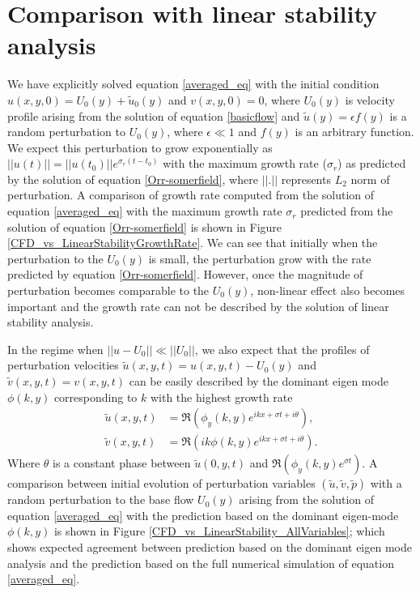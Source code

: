 \documentclass[12pt]{report}   %
\begin{document}
\section{Comparison with linear stability analysis}
We have explicitly solved equation \eqref{averaged_eq} with the initial condition $u(x,y,0) = U_{0}(y)+\tilde{u}_0(y)$ and $v(x,y,0)=0$, where $U_{0}(y)$ is velocity profile arising from the solution of equation \eqref{basicflow} and $\tilde{u}(y) = \epsilon f(y)$ is a random perturbation to $U_0(y)$, where $\epsilon \ll 1$ and $f(y)$ is an arbitrary function. We expect this perturbation to grow exponentially as $||u(t)|| = ||u(t_0)|| e^{\sigma_r (t-t_0)}$ with the maximum growth rate ($\sigma_r$) as predicted by the solution of equation \eqref{Orr-somerfield}, where $||.||$ represents $L_2$ norm of perturbation. A comparison of growth rate computed from the solution of equation \eqref{averaged_eq} with the
maximum growth rate $\sigma_r$ predicted from the solution of equation \eqref{Orr-somerfield} is shown in Figure \ref{CFD_vs_LinearStabilityGrowthRate}. We can see that initially when the perturbation to the $U_0(y)$ is small, the perturbation grow with the rate predicted by equation \eqref{Orr-somerfield}. However, once the magnitude of perturbation becomes comparable to the $U_0(y)$, non-linear effect also becomes important and the growth rate can not be described by the solution of linear stability analysis. 

In the regime when $||u-U_0|| \ll ||U_0||$, we also expect that the profiles of perturbation velocities $\tilde{u}(x,y,t) = u(x,y,t) - U_0(y)$ and $\tilde{v}(x,y,t) = v(x,y,t)$ can be easily described by the dominant eigen mode $\phi(k,y)$ corresponding to $k$ with the highest growth rate
\begin{equation}
\begin{split}
 \tilde{u}(x,y,t) &= \Re\left(\phi_y(k,y) e^{ikx+\sigma t+ i\theta}\right),\\
 \tilde{v}(x,y,t) &= \Re\left(ik \phi(k,y) e^{ikx+\sigma t + i\theta }\right).
\end{split}
\end{equation}
Where $\theta$ is a constant phase between $\tilde{u}(0,y,t)$ and $\Re(\phi_y(k,y) e^{\sigma t})$. A comparison between initial evolution of perturbation variables $(\tilde{u}, \tilde{v}, \tilde{p})$ with a random perturbation to the base flow $U_0(y)$ arising from the solution of equation \eqref{averaged_eq} with the prediction based  on the dominant eigen-mode $\phi(k,y)$ is shown in Figure \ref{CFD_vs_LinearStability_AllVariables}; which shows expected agreement between prediction based on the dominant eigen mode analysis and the prediction based on the full numerical simulation of equation \eqref{averaged_eq}.
\end{document}
